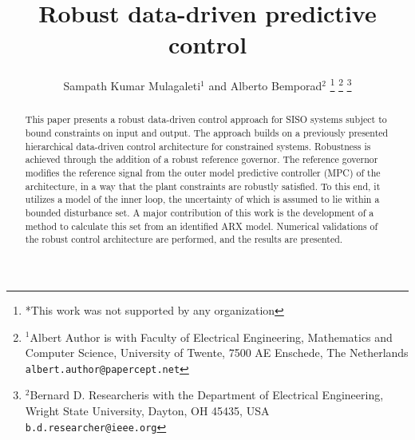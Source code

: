 \documentclass[letterpaper, 10 pt, conference]{ieeeconf}  %
\title{\LARGE \bf
Robust data-driven predictive control
}
\author{Sampath Kumar Mulagaleti$^{1}$ and Alberto Bemporad$^{2}$%
\thanks{*This work was not supported by any organization}%
\thanks{$^{1}$Albert Author is with Faculty of Electrical Engineering, Mathematics and Computer Science,
        University of Twente, 7500 AE Enschede, The Netherlands
        {\tt\small albert.author@papercept.net}}%
\thanks{$^{2}$Bernard D. Researcheris with the Department of Electrical Engineering, Wright State University,
        Dayton, OH 45435, USA
        {\tt\small b.d.researcher@ieee.org}}%
}
\begin{document}
\maketitle
\thispagestyle{empty}
\pagestyle{empty}


\begin{abstract}

This paper presents a robust data-driven control approach for SISO systems subject to bound constraints on input and output.
 The approach builds on a previously presented hierarchical data-driven control architecture for constrained systems. Robustness is achieved through the addition of a robust reference governor. The reference governor modifies the reference signal from the outer model predictive controller (MPC) of the architecture, in a way that the plant constraints are robustly satisfied. To this end, it utilizes a model of the inner loop, the uncertainty of which is assumed to lie within a bounded disturbance set. A major contribution of this work is the development of a method to calculate this set from an identified ARX model. Numerical validations of the robust control architecture are performed, and the results are presented.

\end{abstract}


\end{document}
